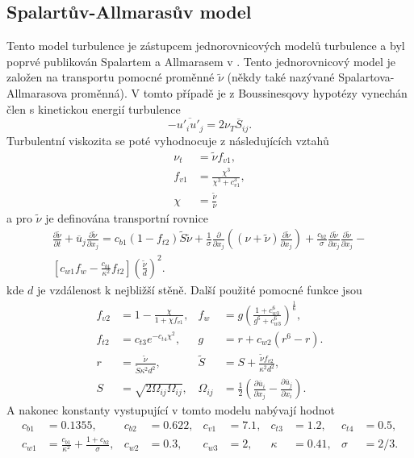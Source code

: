 \subsection{Spalartův-Allmarasův model}
Tento model turbulence je zástupcem jednorovnicových modelů turbulence a byl poprvé publikován Spalartem a Allmarasem v \cite{spalart1992one}. Tento jednorovnicový model je založen na transportu pomocné proměnné $\widetilde{\nu}$ (někdy také nazývané Spalartova-Allmarasova proměnná). V tomto případě je z Boussinesqovy hypotézy vynechán člen s kinetickou energií turbulence
\begin{equation}
-\overline{u'_i u'_j} = 2\nu_T \overline{S}_{ij}.
\end{equation}
Turbulentní viskozita se poté vyhodnocuje z následujících vztahů
\begin{align}
\nu_t &= \widetilde{\nu}f_{v1},\\
f_{v1} &= \frac{\chi^3}{\chi^3 + c^3_{v1}},\\
\chi &= \frac{\widetilde{\nu}}{\nu}
\end{align}
a pro $\widetilde{\nu}$ je definována transportní rovnice
\begin{multline}
\frac{\partial \widetilde{\nu}}{\partial t} + \overline{u}_j\frac{\partial \widetilde{\nu}}{\partial x_j} = c_{b1}(1-f_{t2})\widetilde{S}\widetilde{\nu} + \frac{1}{\sigma}\frac{\partial}{\partial x_j}\left((\nu + \widetilde{\nu})\frac{\partial \widetilde{\nu}}{\partial x_j} \right) + \frac{c_{b2}}{\sigma}\frac{\partial \widetilde{\nu}}{\partial x_j}\frac{\partial \widetilde{\nu}}{\partial x_j} - \\ \left[c_{w1}f_{w}-\frac{c_{b1}}{\kappa^2}f_{t2}\right]\left( \frac{\widetilde{\nu}}{d} \right)^2.
\end{multline}
kde $ d $ je vzdálenost k nejbližší stěně. Další použité pomocné funkce jsou
\begin{align*}
f_{v2} &= 1 - \frac{\chi}{1+\chi f_{v1}},   &f_{w} &= g \left( \frac{1+c_{w3}^6}{g^6 + c_{w3}^6} \right)^{\frac{1}{6}}, \\
f_{t2} &= c_{t3}e^{-c_{t4}\chi^2},   &g &= r + c_{w2}(r^6 - r).\\
r &= \frac{\widetilde{\nu}}{\widetilde{S}\kappa^2d^2},  &\widetilde{S} &= S + \frac{\widetilde{\nu}f_{v2}}{\kappa^2 d^2}, \\ 
S &= \sqrt{2\Omega_{ij}\Omega_{ij}}, &\Omega_{ij} &= \frac{1}{2}\left( \frac{\partial \overline{u}_i}{\partial x_j} - \frac{\partial \overline{u}_j}{\partial x_i} \right).
\end{align*}
A nakonec konstanty vystupující v tomto modelu nabývají hodnot 
\begin{align*}
c_{b1} &= 0.1355,  &c_{b2} &= 0.622,  &c_{v1} &= 7.1,  &c_{t3} &= 1.2, &c_{t4} &= 0.5,\\
c_{w1} &= \frac{c_{b1}}{\kappa^2} + \frac{1+c_{b2}}{\sigma},  &c_{w2} &= 0.3,  &c_{w3} &= 2,  &\kappa &= 0.41,  &\sigma &= 2/3.
\end{align*}

